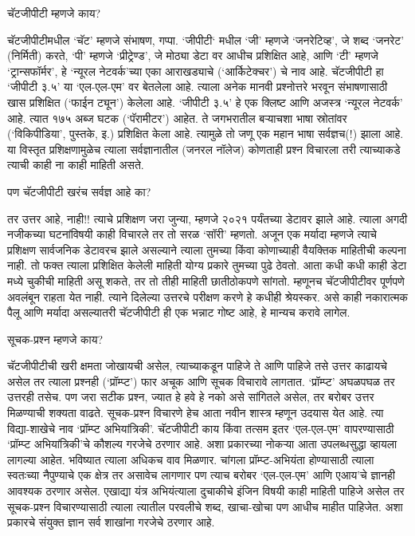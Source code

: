 चॅटजीपीटी म्हणजे काय?

चॅटजीपीटीमधील `चॅट' म्हणजे संभाषण, गप्पा. `जीपीटी` मधील `जी' म्हणजे `जनरेटिव्ह', जे शब्द `जनरेट' (निर्मिती) करते, `पी' म्हणजे `प्रीट्रेण्ड', जे मोठ्या डेटा वर आधीच प्रशिक्षित आहे, आणि `टी' म्हणजे `ट्रान्सफॉर्मर', हे `न्यूरल नेटवर्क'च्या एका आराखड्याचे (`आर्किटेक्चर') चे नाव आहे. चॅटजीपीटी हा `जीपीटी ३.५' या `एल-एल-एम' वर बेतलेला आहे. त्याला अनेक मानवी प्रश्नोत्तरे भरवून संभाषणासाठी खास प्रशिक्षित (`फाईन ट्यून') केलेला आहे. `जीपीटी ३.५' हे एक क्लिष्ट आणि अजस्त्र `न्यूरल नेटवर्क' आहे. त्यात १७५ अब्ज घटक (`पॅरामीटर') आहेत. ते जगभरातील बऱ्याचशा भाषा स्रोतांवर (`विकिपीडिया', पुस्तके, इ.) प्रशिक्षित केला आहे. त्यामुळे तो जणू एक महान भाषा सर्वज्ञच(!) झाला आहे. या विस्तृत प्रशिक्षणामुळेच त्याला सर्वज्ञानातील (जनरल नॉलेज) कोणताही प्रश्न विचारला तरी त्याच्याकडे त्याची काही ना काही माहिती असते.

पण चॅटजीपीटी खरंच सर्वज्ञ आहे का? 

तर उत्तर आहे, नाही!! त्याचे प्रशिक्षण जरा जुन्या, म्हणजे २०२१ पर्यंतच्या डेटावर झाले आहे. त्याला अगदी नजीकच्या घटनांविषयी काही विचारले तर तो सरळ `सॉरी' म्हणतो. अजून एक मर्यादा म्हणजे त्याचे प्रशिक्षण सार्वजनिक डेटावरच झाले असल्याने त्याला तुमच्या किंवा कोणाच्याही वैयक्तिक माहितीची कल्पना नाही. तो फक्त त्याला प्रशिक्षित केलेली माहिती योग्य प्रकारे तुमच्या पुढे ठेवतो. आता कधी कधी काही डेटा मध्ये चुकीची माहिती असू शकते, तर तो तीही माहिती छातीठोकपणे सांगतो. म्हणूनच चॅटजीपीटीवर पूर्णपणे अवलंबून राहता येत नाही. त्याने दिलेल्या उत्तरचे परीक्षण करणे हे कधीही श्रेयस्कर. असे काही नकारात्मक पैलू आणि मर्यादा असल्यातरी चॅटजीपीटी ही एक भन्नाट गोष्ट आहे, हे मान्यच करावे लागेल.

सूचक-प्रश्न म्हणजे काय?

चॅटजीपीटीची खरी क्षमता जोखायची असेल, त्याच्याकडून पाहिजे ते आणि पाहिजे तसे उत्तर काढायचे असेल तर त्याला प्रश्नही (`प्रॉम्प्ट') फार अचूक आणि सूचक विचारावे लागतात. `प्रॉम्प्ट' अघळपघळ तर उत्तरही तसेच. पण जरा सटीक प्रश्न, ज्यात हे हवे हे नको असे सांगितले असेल, तर बरोबर उत्तर मिळण्याची शक्यता वाढते. सूचक-प्रश्न विचारणे हेच आता नवीन शास्त्र म्हणून उदयास येत आहे. त्या विद्या-शाखेचे नाव `प्रॉम्प्ट अभियांत्रिकी'. चॅटजीपीटी काय किंवा तत्सम इतर `एल-एल-एम' वापरण्यासाठी `प्रॉम्प्ट अभियांत्रिकी'चे कौशल्य गरजेचे ठरणार आहे. अशा प्रकारच्या नोकऱ्या आता उपलब्धसुद्धा व्हायला लागल्या आहेत. भविष्यात त्याला अधिकच वाव मिळणार. चांगला प्रॉम्प्ट-अभियंता होण्यासाठी त्याला स्वतःच्या नैपुण्याचे एक क्षेत्र तर असावेच लागणार पण त्याच बरोबर `एल-एल-एम' आणि एआय'चे ज्ञानही आवश्यक ठरणार असेल. एखाद्या यंत्र अभियंत्याला दुचाकीचे इंजिन विषयी काही माहिती पाहिजे असेल तर सूचक-प्रश्न विचारण्यासाठी त्याला त्यातील परवलीचे शब्द, खाचा-खोचा पण आधीच माहीत पाहिजेत. अशा प्रकारचे संयुक्त ज्ञान सर्व शाखांना गरजेचे ठरणार आहे.

